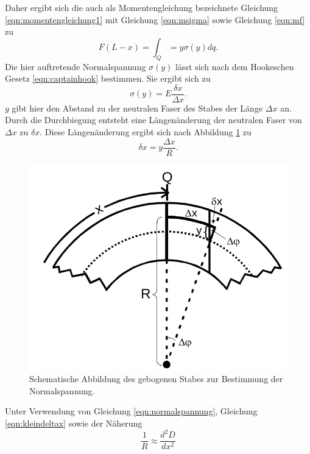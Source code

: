 Daher ergibt sich die auch als Momentengleichung bezeichnete Gleichung \eqref{eqn:momentengleichung1}
mit Gleichung \eqref{eqn:msigma} sowie Gleichung \eqref{eqn:mf} zu
\begin{equation}
  F(L - x) = \int_Q = y \sigma(y) dq.
  \label{eqn:momentengleichung2}
\end{equation}
Die hier auftretende Normalspannung $\sigma(y)$ lässt sich nach dem Hookeschen Gesetz \eqref{eqn:captainhook} bestimmen.
Sie ergibt sich zu
\begin{equation}
  \sigma(y) = E \frac{\delta x}{\Delta x}.
  \label{eqn:normalspannung}
\end{equation}
$y$ gibt hier den Abstand zu der neutralen Faser des Stabes der Länge $\Delta x$ an.
Durch die Durchbiegung entsteht eine Längenänderung der neutralen Faser von $\Delta x$ zu $\delta x$.
Diese Längenänderung ergibt sich nach Abbildung \ref{fig:einspannungeinseitig2} zu
\begin{equation}
  \delta x = y \frac{\Delta x}{R}.
  \label{eqn:kleindeltax}
\end{equation}
\begin{figure}[H]
  \centering
  \includegraphics[scale=0.4]{content/EinspannungEinseitig2.png}
  \caption{Schematische Abbildung des gebogenen Stabes zur Bestimmung der Normalspannung.}
  \label{fig:einspannungeinseitig2}
\end{figure}
\noindent
Unter Verwendung von Gleichung \eqref{eqn:normalspannung}, Gleichung \eqref{eqn:kleindeltax} sowie der Näherung
\begin{equation*}
\frac{1}{R} \approx \frac{d^2 D}{d x^2}
\end{equation*}
